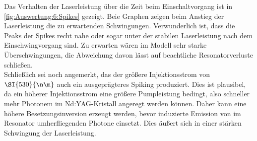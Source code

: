 \documentclass[../../../main.tex]{subfiles}
\begin{document}
    Das Verhalten der Laserleistung über die Zeit beim Einschaltvorgang ist in \ref{fig:Auswertung:6:Spikes} gezeigt. Beie Graphen zeigen beim Anstieg der Laserleistung die zu erwartenden Schwingungen. Verwunderlich ist, dass die Peaks der Spikes recht nahe oder sogar unter der stabilen Laserleistung nach dem Einschwingvorgang sind. Zu erwarten wären im Modell sehr starke Überschwingungen, die Abweichung davon lässt auf beachtliche Resonatorverluste schließen.\\

    Schließlich sei noch angemerkt, das der größere Injektionsstrom von $\SI{530}{\n\m}$ auch ein ausgeprägteres Spiking produziert. Dies ist plausibel, da ein höherer Injektionsstrom eine größere Pumpleistung bedingt, also schneller mehr Photonem im Nd:YAG-Kristall angeregt werden können. Daher kann eine höhere Besetzungsinversion erzeugt werden, bevor induzierte Emission von im Resonator umherfliegenden Photone einsetzt. Dies äußert sich in einer stärken Schwingung der Laserleistung.
\end{document}
